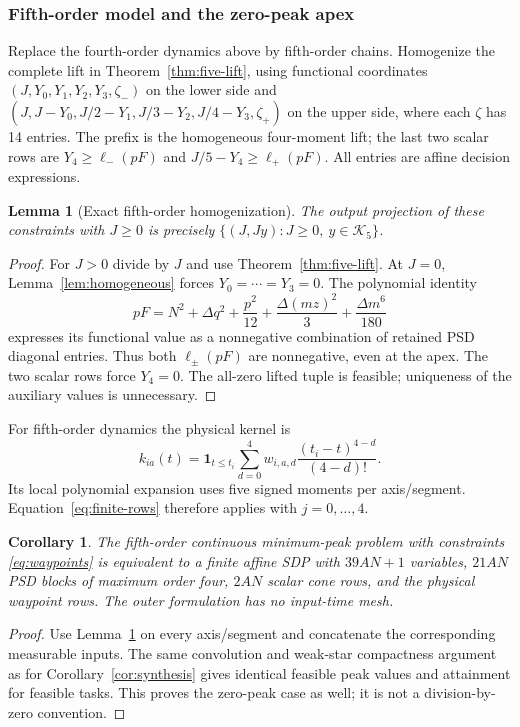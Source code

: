 \documentclass[pdflatex,sn-mathphys-num]{sn-jnl}
\theoremstyle{thmstyleone}
\newtheorem{lemma}[theorem]{Lemma}
\newtheorem{corollary}[theorem]{Corollary}
\theoremstyle{thmstyletwo}\newtheorem{remark}[theorem]{Remark}
\newcommand{\K}{\mathcal K}
\begin{document}
\subsubsection{Fifth-order model and the zero-peak apex}\label{sec:five-synthesis}
Replace the fourth-order dynamics above by fifth-order chains. Homogenize
the complete lift in Theorem~\ref{thm:five-lift}, using functional coordinates
$(J,Y_0,Y_1,Y_2,Y_3,\zeta_-)$ on the lower side and
$(J,J-Y_0,J/2-Y_1,J/3-Y_2,J/4-Y_3,\zeta_+)$ on the upper side,
where each $\zeta$ has 14 entries. The prefix is the homogeneous four-moment
lift; the last two scalar rows are
$Y_4\ge\ell_-(pF)$ and $J/5-Y_4\ge\ell_+(pF)$.
All entries are affine decision expressions.

\begin{lemma}[Exact fifth-order homogenization]\label{lem:five-homogeneous}
The output projection of these constraints with $J\ge0$ is precisely
$\{(J,Jy):J\ge0,\ y\in\K_5\}$.
\end{lemma}
\begin{proof}
For $J>0$ divide by $J$ and use Theorem~\ref{thm:five-lift}.
At $J=0$, Lemma~\ref{lem:homogeneous} forces $Y_0=\cdots=Y_3=0$.
The polynomial identity
\begin{equation}\label{eq:five-apex}
 pF=N^2+\Delta q^2+\frac{p^2}{12}
       +\frac{\Delta(mz)^2}{3}+\frac{\Delta m^6}{180}
\end{equation}
expresses its functional value as a nonnegative combination of retained PSD
diagonal entries. Thus both $\ell_\pm(pF)$ are nonnegative, even at the apex.
The two scalar rows force $Y_4=0$. The all-zero lifted tuple is feasible;
uniqueness of the auxiliary values is unnecessary.
\end{proof}

For fifth-order dynamics the physical kernel is
\[
 k_{ia}(t)=\mathbf1_{t\le t_i}\sum_{d=0}^4
 w_{i,a,d}\frac{(t_i-t)^{4-d}}{(4-d)!}.
\]
Its local polynomial expansion uses five signed moments per axis/segment.
Equation~\eqref{eq:finite-rows} therefore applies with $j=0,\ldots,4$.
\begin{corollary}\label{cor:five-synthesis}
The fifth-order continuous minimum-peak problem with constraints
\eqref{eq:waypoints} is equivalent to a finite affine SDP with $39AN+1$
variables, $21AN$ PSD blocks of maximum order four, $2AN$ scalar cone rows,
and the physical waypoint rows. The outer formulation has no input-time mesh.
\end{corollary}
\begin{proof}
Use Lemma~\ref{lem:five-homogeneous} on every axis/segment and concatenate
the corresponding measurable inputs. The same convolution and weak-star
compactness argument as for Corollary~\ref{cor:synthesis} gives identical
feasible peak values and attainment for feasible tasks. This proves the
zero-peak case as well; it is not a division-by-zero convention.
\end{proof}
\end{document}
